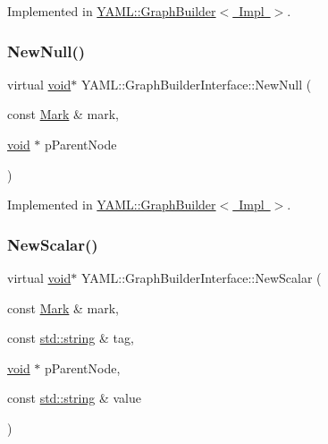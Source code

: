 Implemented in \mbox{\hyperlink{class_y_a_m_l_1_1_graph_builder_a068a87f424528fb7ff77f998d073a92c}{Y\+A\+M\+L\+::\+Graph\+Builder$<$ Impl $>$}}.

\mbox{\label{class_y_a_m_l_1_1_graph_builder_interface_a85e609e41a4552f135e34c9544a8e197}} 
\subsubsection{\texorpdfstring{NewNull()}{NewNull()}}
{\footnotesize\ttfamily virtual \mbox{\hyperlink{glad_8h_a950fc91edb4504f62f1c577bf4727c29}{void}}$\ast$ Y\+A\+M\+L\+::\+Graph\+Builder\+Interface\+::\+New\+Null (\begin{DoxyParamCaption}\item[{const \mbox{\hyperlink{struct_y_a_m_l_1_1_mark}{Mark}} \&}]{mark,  }\item[{\mbox{\hyperlink{glad_8h_a950fc91edb4504f62f1c577bf4727c29}{void}} $\ast$}]{p\+Parent\+Node }\end{DoxyParamCaption})\hspace{0.3cm}{\ttfamily [pure virtual]}}



Implemented in \mbox{\hyperlink{class_y_a_m_l_1_1_graph_builder_a87d59ffe96e3101f96e0791aacba0f0b}{Y\+A\+M\+L\+::\+Graph\+Builder$<$ Impl $>$}}.

\mbox{\label{class_y_a_m_l_1_1_graph_builder_interface_a1d50e0b6c1a5d89a9ef62a5fefc74640}} 
\subsubsection{\texorpdfstring{NewScalar()}{NewScalar()}}
{\footnotesize\ttfamily virtual \mbox{\hyperlink{glad_8h_a950fc91edb4504f62f1c577bf4727c29}{void}}$\ast$ Y\+A\+M\+L\+::\+Graph\+Builder\+Interface\+::\+New\+Scalar (\begin{DoxyParamCaption}\item[{const \mbox{\hyperlink{struct_y_a_m_l_1_1_mark}{Mark}} \&}]{mark,  }\item[{const \mbox{\hyperlink{glad_8h_ac83513893df92266f79a515488701770}{std\+::string}} \&}]{tag,  }\item[{\mbox{\hyperlink{glad_8h_a950fc91edb4504f62f1c577bf4727c29}{void}} $\ast$}]{p\+Parent\+Node,  }\item[{const \mbox{\hyperlink{glad_8h_ac83513893df92266f79a515488701770}{std\+::string}} \&}]{value }\end{DoxyParamCaption})\hspace{0.3cm}{\ttfamily [pure virtual]}}



